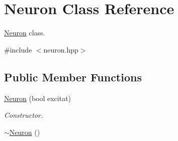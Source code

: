 \hypertarget{classNeuron}{\section{Neuron Class Reference}
\label{classNeuron}
}


\hyperlink{classNeuron}{Neuron} class.  




{\ttfamily \#include $<$neuron.\-hpp$>$}

\subsection*{Public Member Functions}
\begin{DoxyCompactItemize}
\item 
\hyperlink{classNeuron_a52ec1c89f52516f854147320398c1798}{Neuron} (bool excitat)
\begin{DoxyCompactList}\small\item\em Constructor. \end{DoxyCompactList}\item 
\hypertarget{classNeuron_a94a250ce7e167760e593979b899745b1}{\hyperlink{classNeuron_a94a250ce7e167760e593979b899745b1}{$\sim$\-Neuron} ()}\label{classNeuron_a94a250ce7e167760e593979b899745b1}


\end{DoxyCompactItemize}
